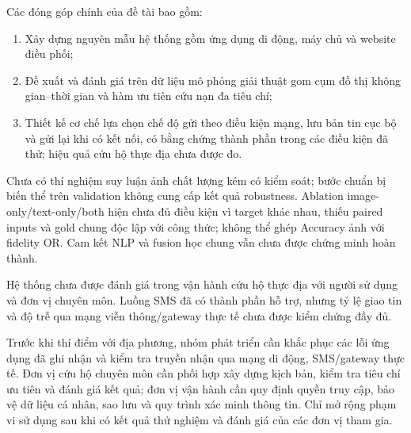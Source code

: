 Các đóng góp chính của đề tài bao gồm:
\begin{enumerate}
\item Xây dựng nguyên mẫu hệ thống gồm ứng dụng di động, máy chủ và website điều phối;
\item Đề xuất và đánh giá trên dữ liệu mô phỏng giải thuật gom cụm đồ thị không gian--thời gian và hàm ưu tiên cứu nạn đa tiêu chí;
\item Thiết kế cơ chế lựa chọn chế độ gửi theo điều kiện mạng, lưu bản tin cục bộ và gửi lại khi có kết nối, có bằng chứng thành phần trong các điều kiện đã thử; hiệu quả cứu hộ thực địa chưa được đo.
\end{enumerate}

Chưa có thí nghiệm suy luận ảnh chất lượng kém có kiểm soát; bước chuẩn bị biến thể trên validation không cung cấp kết quả robustness. Ablation image-only/text-only/both hiện chưa đủ điều kiện vì target khác nhau, thiếu paired inputs và gold chung độc lập với công thức; không thể ghép Accuracy ảnh với fidelity OR. Cam kết NLP và fusion học chung vẫn chưa được chứng minh hoàn thành.

Hệ thống chưa được đánh giá trong vận hành cứu hộ thực địa với người sử dụng và đơn vị chuyên môn. Luồng SMS đã có thành phần hỗ trợ, nhưng tỷ lệ giao tin và độ trễ qua mạng viễn thông/gateway thực tế chưa được kiểm chứng đầy đủ.

Trước khi thí điểm với địa phương, nhóm phát triển cần khắc phục các lỗi ứng dụng đã ghi nhận và kiểm tra truyền nhận qua mạng di động, SMS/gateway thực tế. Đơn vị cứu hộ chuyên môn cần phối hợp xây dựng kịch bản, kiểm tra tiêu chí ưu tiên và đánh giá kết quả; đơn vị vận hành cần quy định quyền truy cập, bảo vệ dữ liệu cá nhân, sao lưu và quy trình xác minh thông tin. Chỉ mở rộng phạm vi sử dụng sau khi có kết quả thử nghiệm và đánh giá của các đơn vị tham gia.

